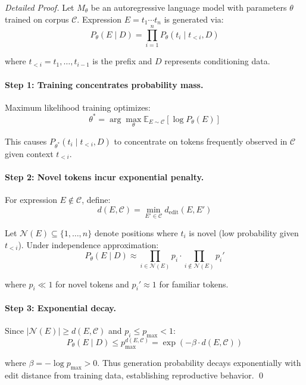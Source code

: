 \documentclass[11pt,a4paper]{article}
\begin{document}
\begin{proof}[Detailed Proof]
Let $M_\theta$ be an autoregressive language model with parameters $\theta$ trained on corpus $\mathcal{C}$. Expression $E = t_1 \cdots t_n$ is generated via:
\[
P_\theta(E \mid D) = \prod_{i=1}^n P_\theta(t_i \mid t_{<i}, D)
\]

where $t_{<i} = t_1, \ldots, t_{i-1}$ is the prefix and $D$ represents conditioning data.

\paragraph{Step 1: Training concentrates probability mass.}

Maximum likelihood training optimizes:
\[
\theta^* = \arg\max_\theta \mathbb{E}_{E \sim \mathcal{C}}[\log P_\theta(E)]
\]

This causes $P_{\theta^*}(t_i \mid t_{<i}, D)$ to concentrate on tokens frequently observed in $\mathcal{C}$ given context $t_{<i}$.

\paragraph{Step 2: Novel tokens incur exponential penalty.}

For expression $E \notin \mathcal{C}$, define:
\[
d(E, \mathcal{C}) = \min_{E' \in \mathcal{C}} d_{\text{edit}}(E, E')
\]

Let $\mathcal{N}(E) \subseteq \{1, \ldots, n\}$ denote positions where $t_i$ is novel (low probability given $t_{<i}$). Under independence approximation:
\[
P_\theta(E \mid D) \approx \prod_{i \in \mathcal{N}(E)} p_i \cdot \prod_{i \notin \mathcal{N}(E)} p_i'
\]

where $p_i \ll 1$ for novel tokens and $p_i' \approx 1$ for familiar tokens.

\paragraph{Step 3: Exponential decay.}

Since $|\mathcal{N}(E)| \geq d(E, \mathcal{C})$ and $p_i \leq p_{\max} < 1$:
\[
P_\theta(E \mid D) \leq p_{\max}^{d(E, \mathcal{C})} = \exp(-\beta \cdot d(E, \mathcal{C}))
\]

where $\beta = -\log p_{\max} > 0$. Thus generation probability decays exponentially with edit distance from training data, establishing reproductive behavior. \qed
\end{proof}
\end{document}
